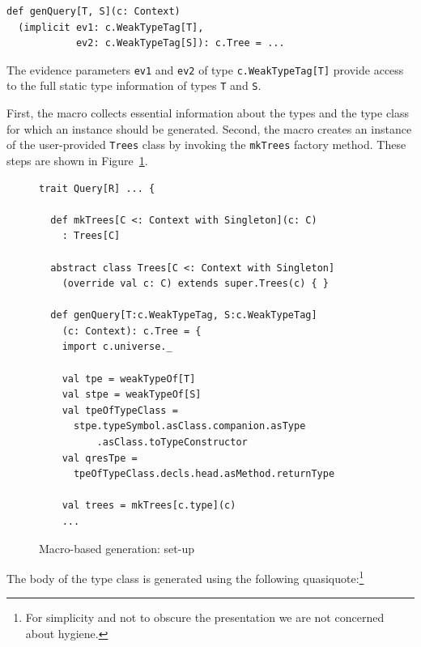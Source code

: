 \documentclass[preprint,nocopyrightspace]{sigplanconf}
\begin{document}
\begin{lstlisting}
def genQuery[T, S](c: Context)
  (implicit ev1: c.WeakTypeTag[T],
            ev2: c.WeakTypeTag[S]): c.Tree = ...
\end{lstlisting}
\noindent
The evidence parameters \verb|ev1| and \verb|ev2| of type \verb|c.WeakTypeTag[T]| provide
access to the full static type information of types \verb|T| and \verb|S|.



First, the macro collects essential information about the types and the type
class for which an instance should be generated. Second, the macro creates an
instance of the user-provided \verb|Trees| class by invoking the
\verb|mkTrees| factory method. These steps are shown in Figure~\ref{fig:macro-set-up}.

\begin{figure}
\centering
\begin{lstlisting}
trait Query[R] ... {

  def mkTrees[C <: Context with Singleton](c: C)
    : Trees[C]

  abstract class Trees[C <: Context with Singleton]
    (override val c: C) extends super.Trees(c) { }

  def genQuery[T:c.WeakTypeTag, S:c.WeakTypeTag]
    (c: Context): c.Tree = {
    import c.universe._

    val tpe = weakTypeOf[T]
    val stpe = weakTypeOf[S]
    val tpeOfTypeClass =
      stpe.typeSymbol.asClass.companion.asType
          .asClass.toTypeConstructor
    val qresTpe =
      tpeOfTypeClass.decls.head.asMethod.returnType

    val trees = mkTrees[c.type](c)
    ...
\end{lstlisting}
  \caption{Macro-based generation: set-up}
  \label{fig:macro-set-up}
\end{figure}

The body of the type class is generated using the following
quasiquote:\footnote{For simplicity and not to obscure the presentation we are
not concerned about hygiene.}
\end{document}
